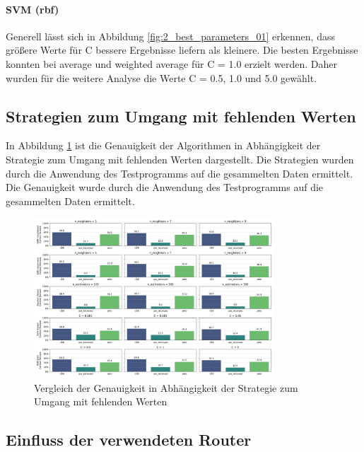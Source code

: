 \paragraph{SVM (rbf)}

Generell lässt sich in Abbildung \ref{fig:2_best_parameters_01} erkennen, dass größere Werte für C bessere Ergebnisse liefern als kleinere. Die besten Ergebnisse konnten bei average und weighted average für C = 1.0 erzielt werden. Daher wurden für die weitere Analyse die Werte C = 0.5, 1.0 und 5.0 gewählt.

\subsection{Strategien zum Umgang mit fehlenden Werten}

In Abbildung \ref{fig:3_handle_missing_values_strategy_01} ist die Genauigkeit der Algorithmen in Abhängigkeit der Strategie zum Umgang mit fehlenden Werten dargestellt. Die Strategien wurden durch die Anwendung des Testprogramms auf die gesammelten Daten ermittelt. Die Genauigkeit wurde durch die Anwendung des Testprogramms auf die gesammelten Daten ermittelt.

\begin{figure}[H]
    \centering
    \includegraphics[width=0.8\textwidth]{images/3_handle_missing_values_strategy_01.png}
    \caption{Vergleich der Genauigkeit in Abhängigkeit der Strategie zum Umgang mit fehlenden Werten}
    \label{fig:3_handle_missing_values_strategy_01}
\end{figure}

\subsection{Einfluss der verwendeten Router}

